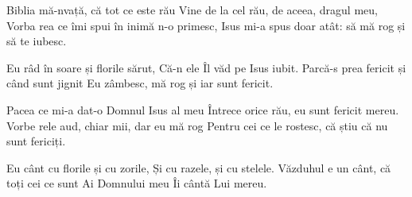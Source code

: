 \beginverse
Biblia mă-nvață, că tot ce este rău
Vine de la cel rău, de aceea, dragul meu,
Vorba rea ce îmi spui în inimă n-o primesc,
Isus mi-a spus doar atât: să mă rog și să te iubesc.
\endverse

\beginchorus
Eu râd în soare și florile sărut,
Că-n ele Îl văd pe Isus iubit.
Parcă-s prea fericit și când sunt jignit
Eu zâmbesc, mă rog și iar sunt fericit.
\endchorus

\beginverse
Pacea ce mi-a dat-o Domnul Isus al meu
Întrece orice rău, eu sunt fericit mereu.
Vorbe rele aud, chiar mii, dar eu mă rog
Pentru cei ce le rostesc, că știu că nu sunt fericiți.
\endverse

\beginchorus
Eu cânt cu florile și cu zorile,
Și cu razele, și cu stelele.
Văzduhul e un cânt, că toți cei ce sunt
Ai Domnului meu Îi cântă Lui mereu.
\endchorus
\endsong